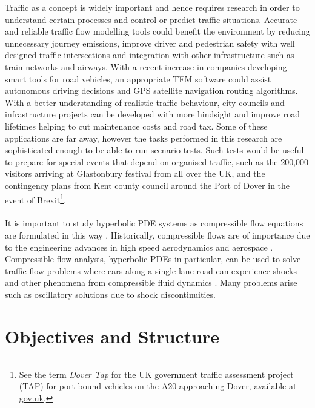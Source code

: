 	Traffic as a concept is widely important and hence requires research in order to understand certain processes and control or predict traffic situations. Accurate and reliable traffic flow modelling tools could benefit the environment by reducing unnecessary journey emissions, improve driver and pedestrian safety with well designed traffic intersections and integration with other infrastructure such as train networks and airways. With a recent increase in companies developing smart tools for road vehicles, an appropriate TFM software could assist autonomous driving decisions and GPS satellite navigation routing algorithms. With a better understanding of realistic traffic behaviour, city councils and infrastructure projects can be developed with more hindsight and improve road lifetimes helping to cut maintenance costs and road tax. Some of these applications are far away, however the tasks performed in this research are sophisticated enough to be able to run scenario tests. Such tests would be useful to prepare for special events that depend on organised traffic, such as the 200,000 visitors arriving at Glastonbury festival from all over the UK, and the contingency plans from Kent county council around the Port of Dover in the event of Brexit\footnote{See the term \emph{Dover Tap} for the UK government traffic assessment project (TAP) for port-bound vehicles on the A20 approaching Dover, available at \href{https://www.gov.uk/government/publications/dover-traffic-assessment-project-tap}{gov.uk}.}.
	\\ \\
	It is important to study hyperbolic PDE systems as compressible flow equations are formulated in this way \cite{Toro09}. Historically, compressible flows are of importance due to the engineering advances in high speed aerodynamics and aerospace \cite{Tu18}. Compressible flow analysis, hyperbolic PDEs in particular, can be used to solve traffic flow problems where cars along a single lane road can experience shocks and other phenomena from compressible fluid dynamics \cite{Thompson72}. Many problems arise such as oscillatory solutions due to shock discontinuities.

\section{Objectives and Structure}
\label{sec:objectives}

